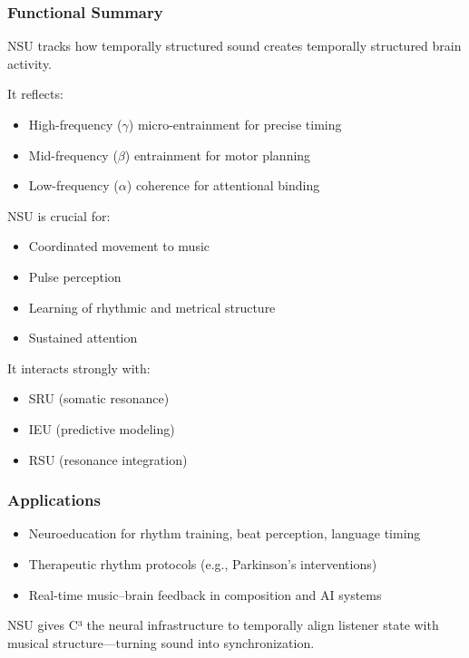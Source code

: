 \subsubsection*{Functional Summary}

NSU tracks how temporally structured sound creates temporally structured brain activity.

It reflects:

\begin{itemize}
    \item High-frequency ($\gamma$) micro-entrainment for precise timing
    \item Mid-frequency ($\beta$) entrainment for motor planning
    \item Low-frequency ($\alpha$) coherence for attentional binding
\end{itemize}

NSU is crucial for:

\begin{itemize}
    \item Coordinated movement to music
    \item Pulse perception
    \item Learning of rhythmic and metrical structure
    \item Sustained attention
\end{itemize}

It interacts strongly with:

\begin{itemize}
    \item SRU (somatic resonance)
    \item IEU (predictive modeling)
    \item RSU (resonance integration)
\end{itemize}

\subsubsection*{Applications}

\begin{itemize}
    \item Neuroeducation for rhythm training, beat perception, language timing
    \item Therapeutic rhythm protocols (e.g., Parkinson’s interventions)
    \item Real-time music–brain feedback in composition and AI systems
\end{itemize}

NSU gives C³ the neural infrastructure to temporally align listener state with musical structure—turning sound into synchronization.

